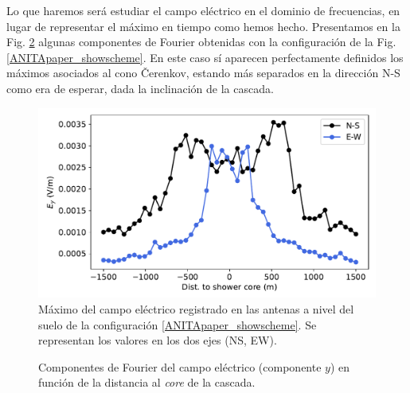 \documentclass[12 pt, a4paper]{article} %
\numberwithin{equation}{section}
\numberwithin{figure}{section}
\numberwithin{table}{section}
\begin{document}
Lo que haremos será estudiar el campo eléctrico en el dominio de frecuencias, en lugar de representar el máximo en tiempo como hemos hecho. Presentamos en la Fig. \ref{freqfieldsgrounds} algunas componentes de Fourier obtenidas con la configuración de la Fig. \ref{ANITApaper_showscheme}. En este caso sí aparecen perfectamente definidos los máximos asociados al cono \v{C}erenkov, estando más separados en la dirección N-S como era de esperar, dada la inclinación de la cascada.

\clearpage
\begin{figure}[H]
	\centering
	\includegraphics[width=.65\linewidth]{figures/radio/downgoing_p_10EeV_70deg_Ey_t_ground}
	\caption{Máximo del campo eléctrico registrado en las antenas a nivel del suelo de la configuración \ref{ANITApaper_showscheme}. Se representan los valores en los dos ejes (NS, EW).}
	\label{downgoing_p_10EeV_70deg_Ey_t_ground}
\end{figure}

\begin{figure}[H]
	\centering
	\caption{Componentes de Fourier del campo eléctrico (componente $y$) en función de la distancia al \textit{core} de la cascada.}
	\label{freqfieldsgrounds}
\end{figure} 
\end{document}
